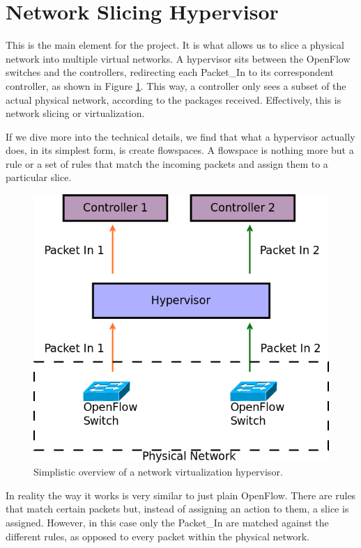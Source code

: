 \section{Network Slicing Hypervisor}
This is the main element for the project. It is what allows us to slice a physical network into multiple virtual networks. A hypervisor sits between the OpenFlow switches and the controllers, redirecting each Packet\_In to its correspondent controller, as shown in Figure \ref{fig:hypervisor}. This way, a controller only sees a subset of the actual physical network, according to the packages received. Effectively, this is network slicing or virtualization.

If we dive more into the technical details, we find that what a hypervisor actually does, in its simplest form, is create flowspaces. A flowspace is nothing more but a rule or a set of rules that match the incoming packets and assign them to a particular slice.

\begin{figure}
  \centering
  \includegraphics[width=\linewidth]{imagenes/Technologies/hypervisor.png}
  \caption{Simplistic overview of a network virtualization hypervisor.}
  \label{fig:hypervisor}
\end{figure}

In reality the way it works is very similar to just plain OpenFlow. There are rules that match certain packets but, instead of assigning an action to them, a slice is assigned. However, in this case only the Packet\_In are matched against the different rules, as opposed to every packet within the physical network.

